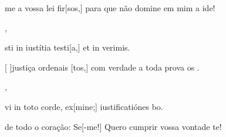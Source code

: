 {    {\item {}me a vossa lei fir[sos,] para que não domine em mim a ide!~\Antiphona},
  {\item {}sti in iustítia testi[a,] et in verimis.~\Antiphona}%
    {\item {}[ ]{jus}tiça ordenais [tos,] com verdade a toda prova os .~\Antiphona},
  {\item {}vi in toto corde, ex[mine;] iustificatiónes bo.~\Antiphona}%
    {\item {} de todo o coração: Se[-me!] Quero cumprir vossa vontade te!~\Antiphona}
}